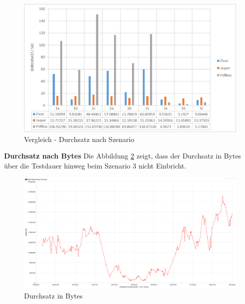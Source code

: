 \documentclass[main.tex]{subfiles}
\begin{document}
\begin{figure}[!ht]
\includegraphics[width=\textwidth]{mainpart/4_analyse_img/VglDurchSzen.png}
 \caption{Vergleich - Durchsatz nach Szenario}
 \label{figure:throughputSzen}
\end{figure}


\textbf{Durchsatz nach Bytes}
Die Abbildung \ref{figure:throughputBytesAll} zeigt, dass der Durchsatz in Bytes über die Testdauer hinweg  beim Szenario 3 nicht Einbricht. 





\begin{figure}[!h]
\includegraphics[width=\textwidth]{mainpart/4_analyse_img/ThroughputOverTimeAll.png}
 \caption{Durchsatz in Bytes}
 \label{figure:throughputBytesAll}
\end{figure}
\end{document}
